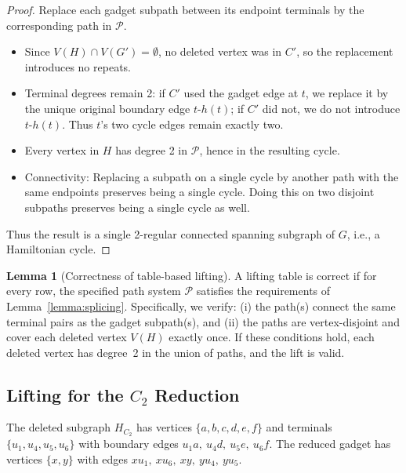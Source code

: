 \documentclass[12pt]{article}
\theoremstyle{definition}
\newtheorem{lemma}[theorem]{Lemma}
\begin{document}
\begin{proof}
Replace each gadget subpath between its endpoint terminals by the corresponding path in $\mathcal{P}$.

\begin{itemize}
    \item Since $V(H) \cap V(G') = \emptyset$, no deleted vertex was in $C'$, so the replacement introduces no repeats.
    \item Terminal degrees remain 2: if $C'$ used the gadget edge at $t$, we replace it by the unique original boundary edge $t$-$h(t)$; if $C'$ did not, we do not introduce $t$-$h(t)$. Thus $t$'s two cycle edges remain exactly two.
    \item Every vertex in $H$ has degree 2 in $\mathcal{P}$, hence in the resulting cycle.
    \item Connectivity: Replacing a subpath on a single cycle by another path with the same endpoints preserves being a single cycle. Doing this on two disjoint subpaths preserves being a single cycle as well.
\end{itemize}

Thus the result is a single 2-regular connected spanning subgraph of $G$, i.e., a Hamiltonian cycle.
\end{proof}


\begin{lemma}[Correctness of table-based lifting]
\label{lem:table-correctness}
A lifting table is correct if for every row, the specified path system $\mathcal{P}$ satisfies the requirements of Lemma~\ref{lemma:splicing}. Specifically, we verify:
(i) the path(s) connect the same terminal pairs as the gadget subpath(s), and
(ii) the paths are vertex-disjoint and cover each deleted vertex $V(H)$ exactly once.
If these conditions hold, each deleted vertex has degree~2 in the union of paths, and the lift is valid.
\end{lemma}

\subsection{Lifting for the $C_2$ Reduction}
\label{subsec:lifting-c2}

The deleted subgraph $H_{C_2}$ has vertices $\{a,b,c,d,e,f\}$ and terminals
$\{u_1,u_4,u_5,u_6\}$ with boundary edges
$u_1a,\ u_4d,\ u_5e,\ u_6f$.
The reduced gadget has vertices $\{x,y\}$ with edges
$xu_1,\ xu_6,\ xy,\ yu_4,\ yu_5$.
\end{document}
